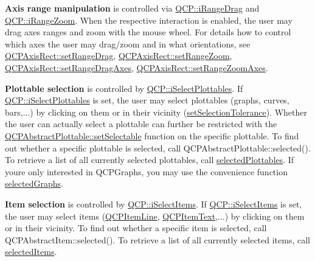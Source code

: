 {\bfseries Axis range manipulation} is controlled via \hyperlink{namespace_q_c_p_a2ad6bb6281c7c2d593d4277b44c2b037a2c4432b9aceafb94000be8d1b589ef18}{Q\+C\+P\+::i\+Range\+Drag} and \hyperlink{namespace_q_c_p_a2ad6bb6281c7c2d593d4277b44c2b037abee1e94353525a636aeaf0ba32b72e14}{Q\+C\+P\+::i\+Range\+Zoom}. When the respective interaction is enabled, the user may drag axes ranges and zoom with the mouse wheel. For details how to control which axes the user may drag/zoom and in what orientations, see \hyperlink{class_q_c_p_axis_rect_ae6aef2f7211ba6097c925dcd26008418}{Q\+C\+P\+Axis\+Rect\+::set\+Range\+Drag}, \hyperlink{class_q_c_p_axis_rect_a7960a9d222f1c31d558b064b60f86a31}{Q\+C\+P\+Axis\+Rect\+::set\+Range\+Zoom}, \hyperlink{class_q_c_p_axis_rect_a648cce336bd99daac4a5ca3e5743775d}{Q\+C\+P\+Axis\+Rect\+::set\+Range\+Drag\+Axes}, \hyperlink{class_q_c_p_axis_rect_a9442cca2aa358405f39a64d51eca13d2}{Q\+C\+P\+Axis\+Rect\+::set\+Range\+Zoom\+Axes}.

{\bfseries Plottable selection} is controlled by \hyperlink{namespace_q_c_p_a2ad6bb6281c7c2d593d4277b44c2b037a67148c8227b4155eca49135fc274c7ec}{Q\+C\+P\+::i\+Select\+Plottables}. If \hyperlink{namespace_q_c_p_a2ad6bb6281c7c2d593d4277b44c2b037a67148c8227b4155eca49135fc274c7ec}{Q\+C\+P\+::i\+Select\+Plottables} is set, the user may select plottables (graphs, curves, bars,...) by clicking on them or in their vicinity (\hyperlink{class_q_custom_plot_a4dc31241d7b09680950e19e5f971ed93}{set\+Selection\+Tolerance}). Whether the user can actually select a plottable can further be restricted with the \hyperlink{class_q_c_p_abstract_plottable_a22c69299eb5569e0f6bf084877a37dc4}{Q\+C\+P\+Abstract\+Plottable\+::set\+Selectable} function on the specific plottable. To find out whether a specific plottable is selected, call Q\+C\+P\+Abstract\+Plottable\+::selected(). To retrieve a list of all currently selected plottables, call \hyperlink{class_q_custom_plot_a6721b8c689bb7f2f400987e580508fe8}{selected\+Plottables}. If you\textquotesingle{}re only interested in Q\+C\+P\+Graphs, you may use the convenience function \hyperlink{class_q_custom_plot_ad2a0493bdd01e7aa99a4209ae3a5b67b}{selected\+Graphs}.

{\bfseries Item selection} is controlled by \hyperlink{namespace_q_c_p_a2ad6bb6281c7c2d593d4277b44c2b037aea2f7c105d674e76d9b187b02ef29260}{Q\+C\+P\+::i\+Select\+Items}. If \hyperlink{namespace_q_c_p_a2ad6bb6281c7c2d593d4277b44c2b037aea2f7c105d674e76d9b187b02ef29260}{Q\+C\+P\+::i\+Select\+Items} is set, the user may select items (\hyperlink{class_q_c_p_item_line}{Q\+C\+P\+Item\+Line}, \hyperlink{class_q_c_p_item_text}{Q\+C\+P\+Item\+Text},...) by clicking on them or in their vicinity. To find out whether a specific item is selected, call Q\+C\+P\+Abstract\+Item\+::selected(). To retrieve a list of all currently selected items, call \hyperlink{class_q_custom_plot_a1a48b13547e2d9ac5cd6927516f47a2e}{selected\+Items}.

